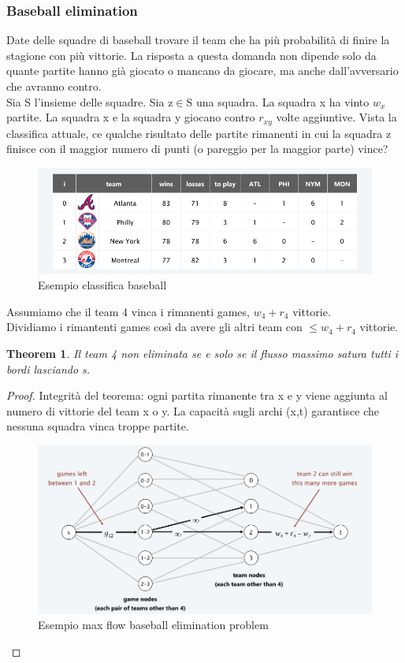 \documentclass{article}
\newtheorem{theorem}{Theorem}[subsection]
\begin{document}
\subsubsection{Baseball elimination}
Date delle squadre di baseball trovare il team che ha più probabilità di finire la stagione con più vittorie. La risposta a questa domanda non dipende solo da quante partite hanno già giocato o mancano da giocare, ma anche dall'avversario che avranno contro.\\
Sia S l'insieme delle squadre. Sia z$\in$S una squadra. La squadra x ha vinto $w_x$ partite. La squadra x e la squadra y giocano contro $r_{xy}$ volte aggiuntive. Vista la classifica attuale, ce qualche risultato delle partite rimanenti in cui la squadra z finisce con il maggior numero di punti (o pareggio per la maggior parte) vince?
\begin{figure}[H]
    \centering
    \includegraphics[width=0.5\linewidth]{Screenshot from 2024-05-05 12-28-27.png}
    \caption{Esempio classifica baseball}
    \label{fig:enter-label}
\end{figure}
Assumiamo che il team 4 vinca i rimanenti games, $w_4+r_4$ vittorie.\\
Dividiamo i rimantenti games così da avere gli altri team con $\leq w_4+r_4$ vittorie.
\begin{theorem}
    Il team 4 non eliminata se e solo se il flusso massimo satura tutti i bordi lasciando s.  
\end{theorem}
\begin{proof}
    Integrità del teorema: ogni partita rimanente tra x e y viene aggiunta al numero di vittorie del team x o y. La capacità sugli archi (x,t) garantisce che nessuna squadra vinca troppe partite.
    \begin{figure}[H]
        \centering
        \includegraphics[width=0.5\linewidth]{Screenshot from 2024-05-05 12-26-50.png}
        \caption{Esempio max flow baseball elimination problem}
        \label{fig:enter-label}
    \end{figure}
\end{proof}
\newpage
\end{document}
